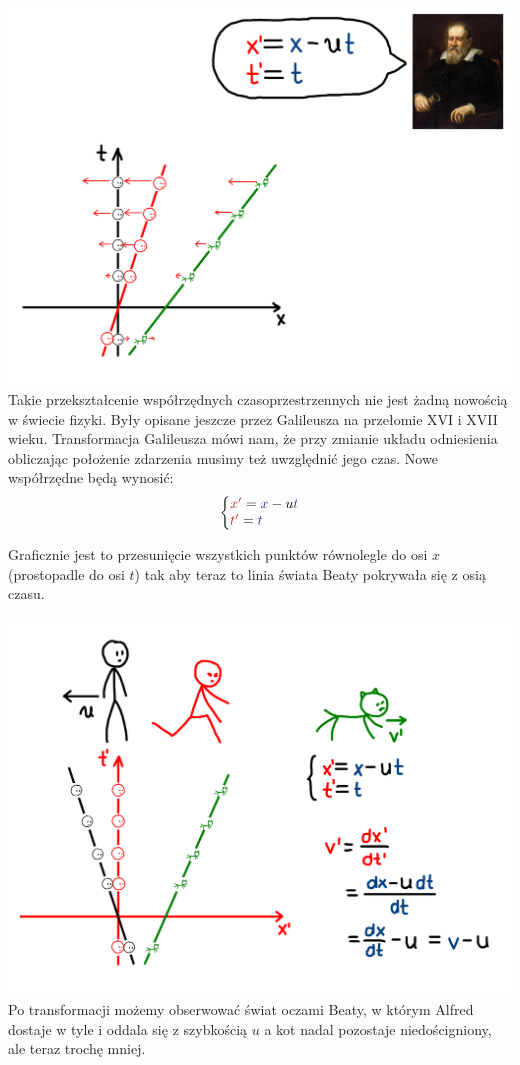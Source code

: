 \documentclass[10pt,twocolumn,fleqn,polish]{article}
\makeatletter
\providecommand{\mathcolor}[2]{{\color{#1}#2}}
\newenvironment{eqsystem}
  {\left\lbrace
    \begin{array}{@{}l@{}}}
  {\end{array}\right.}
\makeatother
\begin{document}
\noindent\includegraphics[width=1\linewidth]{pages/STA-page6}
Takie przekształcenie współrzędnych czasoprzestrzennych nie jest żadną
nowością w świecie fizyki. Były opisane jeszcze przez Galileusza na przełomie
XVI i XVII wieku. Transformacja Galileusza mówi nam, że przy zmianie układu
odniesienia obliczając położenie zdarzenia musimy też uwzględnić jego czas.
Nowe współrzędne będą wynosić:
\[
  \begin{eqsystem}
    \mathcolor{BrickRed}{x'} = \mathcolor{Blue}{x} - u\mathcolor{Blue}{t} \\
    \mathcolor{BrickRed}{t'} = \mathcolor{Blue}{t}
  \end{eqsystem}
\]

Graficznie jest to przesunięcie wszystkich punktów równolegle do osi $x$
(prostopadle do osi $t$) tak aby teraz to linia świata Beaty pokrywała
się z osią czasu.
\newpage

\noindent\includegraphics[width=1\linewidth]{pages/STA-page7}
Po transformacji możemy obserwować świat oczami Beaty, w którym Alfred
dostaje w tyle i oddala się z szybkością $u$ a kot nadal pozostaje
niedościgniony, ale teraz trochę mniej.
\end{document}
